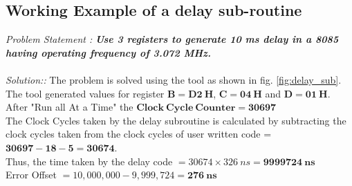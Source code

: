 \subsection{Working Example of a delay sub-routine}
\textit{Problem Statement :}
\textbf{\textit{Use 3 registers to generate 10 ms delay in a 8085 having operating frequency of 3.072 MHz.}} \\\\
\textit{Solution::}
The problem is solved using the tool as shown in fig. \ref{fig:delay_sub}.\\
The tool generated values for register $ \mathbf{B = D2~H} $, $\mathbf{ C = 04 ~H}$ and $\mathbf{ D = 01~H }$.\\
After "Run all At a Time" the $ \mathbf{Clock~ Cycle~ Counter = 30697} $\\
The Clock Cycles taken by the delay subroutine is calculated by subtracting the clock cycles taken from the clock cycles of user written code = $\mathbf{ 30697 - 18 - 5 =30674}$.\\
Thus, the time taken by the delay code $= 30674 \times 326 ~ns = \mathbf{9999724~ns} $\\
Error Offset $ = 10,000,000 - 9,999,724 = \mathbf{276 ~ns}$
